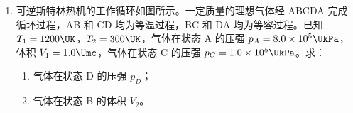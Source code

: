 \documentclass[\gkver]{gaokaozhenti}
\begin{document}
\begin{enumerate}
{（4）根据电阻定律 $R_{x} = \rho\frac{l}{dh} = \frac{\rho}{dh}\cdot l$，故可得 $k = \frac{\rho}{dh}$，得 $\rho = kdh$

电阻率越小更容易导电，根据图像可知 $65^{\circ}$C 的水的电阻率更小，故可知温度高的水更容易导电。

（5）根据前面分析可知 $65^{\circ}$C 的水的电阻率为
$\rho = kdh = \frac{8\times10^{3}}{0.7}\times0.07\times0.03 \UOm = 24 \UOm$

故当选用内直径为 $d_{0} = 8.0 \times 10^{-3} \Um$ 的水管。若人体的安全电流为 $I_{0} = 1.0 \times 10^{-3} \UA$，接入电压 $U = 220 \UV$ 时，得
$\frac{U}{R} = I_{0}$，$R = \rho\frac{l_{m}}{\pi\left(\frac{d_{0}}{2}\right)^{2}}$

解得水管的长度至少应设计为 $l_{m} = 0.46 \Um$
}

\item
可逆斯特林热机的工作循环如图所示。一定质量的理想气体经 ABCDA 完成循环过程，AB 和 CD 均为等温过程，BC 和 DA 均为等容过程。已知 $T_{1} = 1200 \UK$，$T_{2} = 300 \UK$，气体在状态 A 的压强 $p_{A} = 8.0\times10^{5} \UkPa$，体积 $V_{1} = 1.0 \Umc$，气体在状态 C 的压强 $p_{C} = 1.0\times10^{5} \UkPa$。求：
\begin{enumerate}
	\item
	气体在状态 D 的压强 $p_{D}$；
	\item
	气体在状态 B 的体积 $V_{2}$。
\end{enumerate}


\end{enumerate}
\end{document}
